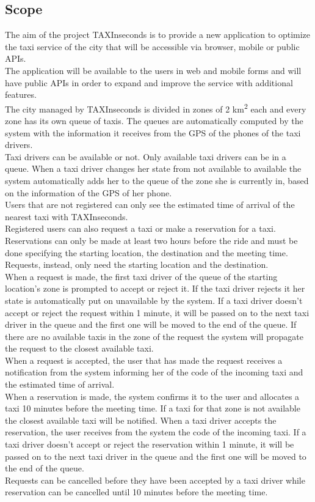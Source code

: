 \documentclass{article}
\begin{document}
\subsection{Scope}
The aim of the project TAXInseconds is to provide a new application to optimize the taxi service of the city that will be accessible via browser, mobile or public APIs.
\\The application will be available to the users in web and mobile forms and will have public APIs in order to expand and improve the service with additional features. %
\\The city managed by TAXInseconds is divided in zones of 2 km\textsuperscript{2} each and every zone has its own queue of taxis. The queues are automatically computed by the system with the information it receives from the GPS of the phones of the taxi drivers.
\\Taxi drivers can be available or not. Only available taxi drivers can be in a queue. When a taxi driver changes her state from not available to available the system automatically adds her to the queue of the zone she is currently in, based on the information of the GPS of her phone. 
\\Users that are not registered can only see the estimated time of arrival of the nearest taxi with TAXInseconds.\@
\\Registered users can also request a taxi or make a reservation for a taxi. Reservations can only be made at least two hours before the ride and must be done specifying the starting location, the destination and the meeting time. Requests, instead, only need the starting location and the destination.
\\When a request is made, the first taxi driver of the queue of the starting location's zone is prompted to accept or reject it. If the taxi driver rejects it her state is automatically put on unavailable by the system. If a taxi driver doesn't accept or reject the request within 1 minute, it will be passed on to the next taxi driver in the queue and the first one will be moved to the end of the queue. If there are no available taxis in the zone of the request the system will propagate the request to the closest available taxi.
\\When a request is accepted, the user that has made the request receives a notification from the system informing her of the code of the incoming taxi and the estimated time of arrival.
\\When a reservation is made, the system confirms it to the user and allocates a taxi 10 minutes before the meeting time. If a taxi for that zone is not available the closest available taxi will be notified. When a taxi driver accepts the reservation, the user receives from the system the code of the incoming taxi. If a taxi driver doesn't accept or reject the reservation within 1 minute, it will be passed on to the next taxi driver in the queue and the first one will be moved to the end of the queue.
\\Requests can be cancelled before they have been accepted by a taxi driver while reservation can be cancelled until 10 minutes before the meeting time.
\end{document}
